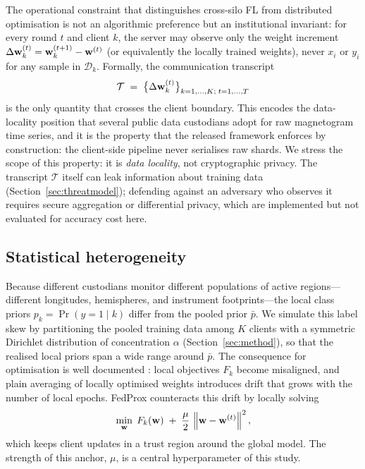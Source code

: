 The operational constraint that distinguishes cross-silo FL from
distributed optimisation is not an algorithmic preference but an
institutional invariant: for every round $t$ and client $k$, the
server may observe only the weight increment
$\Delta \mathbf{w}_k^{(t)} = \mathbf{w}_k^{(t+1)} - \mathbf{w}^{(t)}$ (or equivalently the
locally trained weights), never $x_i$ or $y_i$ for any sample in
$\mathcal{D}_k$. Formally, the communication transcript
\begin{equation}\label{eq:privacy}
    \mathcal{T} \;=\;
    \big\{\Delta \mathbf{w}_k^{(t)}\big\}_{k=1,\dots,K;\; t=1,\dots,T}
\end{equation}
is the only quantity that crosses the client boundary. This encodes
the data-locality position that several public data custodians adopt
for raw magnetogram time series, and it is the property that the
released framework enforces by construction: the client-side pipeline
never serialises raw shards. We stress the scope of this property: it
is \emph{data locality}, not cryptographic privacy. The transcript
$\mathcal{T}$ itself can leak information about training data
(Section~\ref{sec:threatmodel}); defending against an adversary who
observes it requires secure aggregation or differential privacy, which
are implemented but not evaluated for accuracy cost here.

\subsection{Statistical heterogeneity}

Because different custodians monitor different populations of active
regions---different longitudes, hemispheres, and instrument
footprints---the local class priors $p_k = \Pr(y=1 \mid k)$ differ from
the pooled prior $\bar{p}$. We simulate this label skew by partitioning
the pooled training data among $K$ clients with a symmetric Dirichlet
distribution of concentration $\alpha$ (Section~\ref{sec:method}),
so that the realised local priors span a wide range around $\bar{p}$.
The consequence for optimisation is well documented
\cite{zhao2018,li2020}: local objectives $F_k$ become misaligned, and
plain averaging of locally optimised weights introduces drift that
grows with the number of local epochs. FedProx counteracts this drift
by locally solving
\begin{equation}\label{eq:fedprox}
    \min_{\mathbf{w}} \;
    F_k(\mathbf{w}) \;+\; \frac{\mu}{2}\,\left\lVert \mathbf{w} - \mathbf{w}^{(t)} \right\rVert^{2},
\end{equation}
which keeps client updates in a trust region around the global model.
The strength of this anchor, $\mu$, is a central hyperparameter of
this study.

